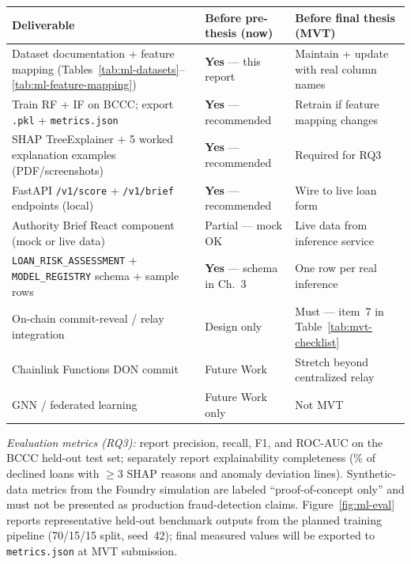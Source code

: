 \documentclass[12pt,a4paper]{report}
\newcommand{\tableheadcolor}{\rowcolor{TableHeadBg}}
\begin{document}
\begin{table}[H]
\centering
\begin{tabular}{p{5.2cm}p{3.8cm}p{4.2cm}}
\toprule
\tableheadcolor
\textbf{Deliverable} & \textbf{Before pre-thesis (now)} & \textbf{Before final thesis (MVT)} \\
\midrule
Dataset documentation + feature mapping (Tables~\ref{tab:ml-datasets}--\ref{tab:ml-feature-mapping}) & \textbf{Yes} --- this report & Maintain + update with real column names \\
Train RF + IF on BCCC; export \texttt{.pkl} + \texttt{metrics.json} & \textbf{Yes} --- recommended & Retrain if feature mapping changes \\
SHAP TreeExplainer + 5 worked explanation examples (PDF/screenshots) & \textbf{Yes} --- recommended & Required for RQ3 \\
FastAPI \texttt{/v1/score} + \texttt{/v1/brief} endpoints (local) & \textbf{Yes} --- recommended & Wire to live loan form \\
Authority Brief React component (mock or live data) & Partial --- mock OK & Live data from inference service \\
\texttt{LOAN\_RISK\_ASSESSMENT} + \texttt{MODEL\_REGISTRY} schema + sample rows & \textbf{Yes} --- schema in Ch.~3 & One row per real inference \\
On-chain commit-reveal / relay integration & Design only & Must --- item~7 in Table~\ref{tab:mvt-checklist} \\
Chainlink Functions DON commit & Future Work & Stretch beyond centralized relay \\
GNN / federated learning & Future Work only & Not MVT \\
\bottomrule
\end{tabular}
\end{table}

\noindent\textit{Evaluation metrics (RQ3):} report precision, recall, F1, and ROC-AUC on the BCCC held-out test set; separately report explainability completeness (\% of declined loans with $\geq$3 SHAP reasons and anomaly deviation lines). Synthetic-data metrics from the Foundry simulation are labeled ``proof-of-concept only'' and must not be presented as production fraud-detection claims. Figure~\ref{fig:ml-eval} reports representative held-out benchmark outputs from the planned training pipeline (70/15/15 split, seed~42); final measured values will be exported to \texttt{metrics.json} at MVT submission.
\end{document}
